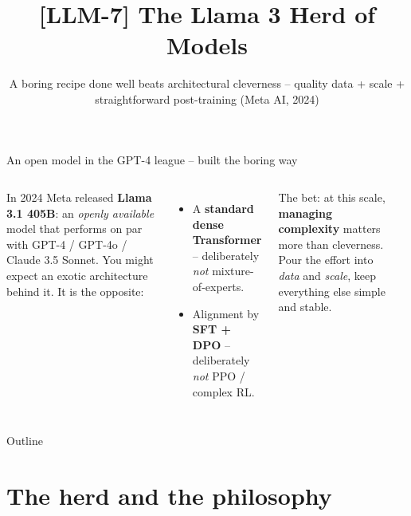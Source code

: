 \documentclass[aspectratio=169]{beamer}
\title{[LLM-7] The Llama 3 Herd of Models}
\subtitle{A boring recipe done well beats architectural cleverness -- quality data + scale + straightforward post-training (Meta AI, 2024)}
\date{}
\begin{document}
\begin{frame}{An open model in the GPT-4 league -- built the boring way}
  \begin{columns}[T]
    In 2024 Meta released \textbf{Llama 3.1 405B}: an \emph{openly available} model that
    performs on par with GPT-4 / GPT-4o / Claude 3.5 Sonnet.
    \vskip 8pt
    You might expect an exotic architecture behind it. It is the opposite:
    \begin{itemize}\small
      \item A \textbf{standard dense Transformer} -- deliberately \emph{not} mixture-of-experts.
      \item Alignment by \textbf{SFT + DPO} -- deliberately \emph{not} PPO / complex RL.
    \end{itemize}
    \vskip 8pt
    The bet: at this scale, \textbf{managing complexity} matters more than cleverness.
    Pour the effort into \emph{data} and \emph{scale}, keep everything else simple and stable.
    \begin{center}
    \end{center}
  \end{columns}
\end{frame}

\begin{frame}{Outline}
  \tableofcontents
\end{frame}

\section{The herd and the philosophy}
\end{document}
